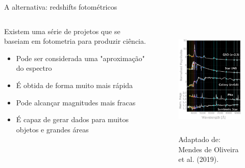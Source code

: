 \begin{frame}[c]{A alternativa: redshifts fotométricos}
    \begin{columns}[c]
        \begin{column}{0.46\linewidth}
            \justifying
            Existem uma série de projetos que se baseiam em fotometria para produzir ciência.
            \begin{itemize}
                \justifying
                \item Pode ser considerada uma "aproximação" do espectro
                \item É obtida de forma muito mais rápida
                \item Pode alcançar magnitudes mais fracas
                \item É capaz de gerar dados para muitos objetos e grandes áreas
            \end{itemize}
        \end{column}
        \hspace*{-0.5cm}
        \begin{column}{0.46\linewidth}
            \begin{figure}
                \centering
                \includegraphics[height=5.5cm]{script/images/splus_spectra_sed.png}
                \caption{Adaptado de: Mendes de Oliveira et al. (2019).}
            \end{figure}
        \end{column}
    \end{columns}
\end{frame}

